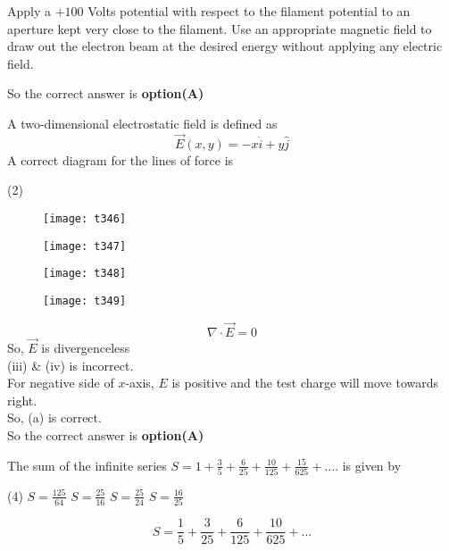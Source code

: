 \begin{questions}
\begin{tasks}
	\task[\textbf{C.}] Apply a $+100$ Volts potential with respect to the filament potential to an aperture kept very close to the filament.
	\task[\textbf{D.}] Use an appropriate magnetic field to draw out the electron beam at the desired energy without applying any electric field.
\end{tasks}
\begin{answer}
	So the correct answer is \textbf{option(A)}
\end{answer}
\begin{minipage}{\textwidth}
	\question A two-dimensional electrostatic field is defined as
	$$
	\vec{E}(x, y)=-x \hat{i}+y \hat{j}
	$$
	A correct diagram for the lines of force is
\end{minipage}
\begin{tasks}(2)
	\task[\textbf{A.}] \begin{figure}[H]
		\centering
		\texttt{[image: t346]}
	\end{figure}
	\task[\textbf{B.}] \begin{figure}[H]
		\centering
		\texttt{[image: t347]}
	\end{figure}
	\task[\textbf{C.}] \begin{figure}[H]
		\centering
		\texttt{[image: t348]}
	\end{figure}
	\task[\textbf{D.}] \begin{figure}[H]
		\centering
		\texttt{[image: t349]}
	\end{figure}
\end{tasks}
\begin{answer}
	$$
	\nabla \cdot \vec{E}=0
	$$
	So, $\vec{E}$ is divergenceless\\
	(iii) \& (iv) is incorrect.\\
	For negative side of $x$-axis, $E$ is positive and the test charge will move towards right. \\So, (a) is correct.\\
	So the correct answer is \textbf{option(A)}
\end{answer}
\begin{minipage}{\textwidth}
	\question The sum of the infinite series $S=1+\frac{3}{5}+\frac{6}{25}+\frac{10}{125}+\frac{15}{625}+\ldots .$ is given by
\end{minipage}
\begin{tasks}(4)
	\task[\textbf{A.}] $S=\frac{125}{64}$
	\task[\textbf{B.}] $S=\frac{25}{16}$
	\task[\textbf{C.}] $S=\frac{25}{24}$
	\task[\textbf{D.}]   $S=\frac{16}{25}$
\end{tasks}
\begin{answer}
	$$
	S=\frac{1}{5}+\frac{3}{25}+\frac{6}{125}+\frac{10}{625}+\ldots
	$$
	

\end{answer}
\end{questions}
